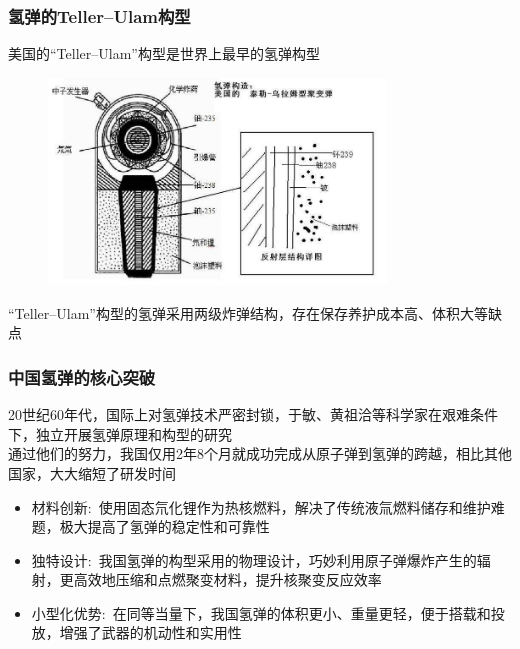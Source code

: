 \begin{frame}
	\frametitle{氢弹的\textrm{Teller–Ulam}构型}
美国的``Teller–Ulam''构型是世界上最早的氢弹构型\\
    \vspace{-0.3cm}
    \begin{figure}
        \includegraphics[width=0.8\textwidth]{Figures_History/U-T_design.jpg}
    \end{figure}
		``Teller–Ulam''构型的氢弹采用两级炸弹结构，存在保存养护成本高、体积大等缺点
\end{frame}

\begin{frame}
    \frametitle{中国氢弹的核心突破}
    20世纪60年代，国际上对氢弹技术严密封锁，于敏、黄祖洽等科学家在艰难条件下，独立开展氢弹原理和构型的研究\\
    通过他们的努力，我国仅用2年8个月就成功完成从原子弹到氢弹的跨越，相比其他国家，大大缩短了研发时间
    \begin{itemize}
        \item 材料创新:~使用固态氘化锂作为热核燃料，解决了传统液氚燃料储存和维护难题，极大提高了氢弹的稳定性和可靠性
        \item 独特设计:~我国氢弹的构型采用的物理设计，巧妙利用原子弹爆炸产生的辐射，更高效地压缩和点燃聚变材料，提升核聚变反应效率
        \item 小型化优势:~在同等当量下，我国氢弹的体积更小、重量更轻，便于搭载和投放，增强了武器的机动性和实用性
    \end{itemize}
\end{frame}

